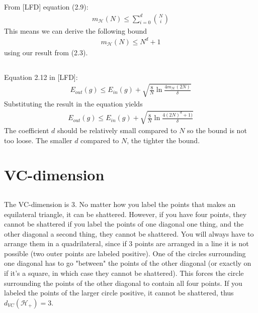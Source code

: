\documentclass[a4paper]{article}
\begin{document}
\subsection{}
From [LFD] equation (2.9):
\begin{align*}
m_\mathcal{H}(N)\leq \sum_{i=0}^d \binom{N}{i}
\end{align*}
This means we can derive the following bound
\begin{align*}
m_\mathcal{H}(N)\leq N^d+1
\end{align*}
using our result from (2.3).

\subsection{}
Equation 2.12 in [LFD]:
\begin{align*}
E_{out}(g)\leq E_{in}(g)+\sqrt{\frac{8}{N}\ln \frac{4m_{\mathcal{H}}(2N)}{\delta}}
\end{align*}
Substituting the result in the equation yields
\begin{align*}
E_{out}(g)\leq E_{in}(g)+\sqrt{\frac{8}{N}\ln \frac{4(2N)^d+1)}{\delta}}
\end{align*}
The coefficient $d$ should be relatively small compared to $N$ so the bound is not too loose. The smaller $d$ compared to $N$, the tighter the bound.

\section{VC-dimension}

\subsection{}
The VC-dimension is $3$. No matter how you label the points that makes an equilateral triangle, it can be shattered. However, if you have four points, they cannot be shattered if you label the points of one diagonal one thing, and the other diagonal a second thing, they cannot be shattered. You will always have to arrange them in a quadrilateral, since if $3$ points are arranged in a line it is not possible (two outer points are labeled positive). One of the circles surrounding one diagonal has to go "between" the points of the other diagonal (or exactly on if it's a square, in which case they cannot be shattered). This forces the circle surrounding the points of the other diagonal to contain all four points. If you labeled the points of the larger circle positive, it cannot be shattered, thus $d_{VC}(\mathcal{H}_+)=3$.
\end{document}
